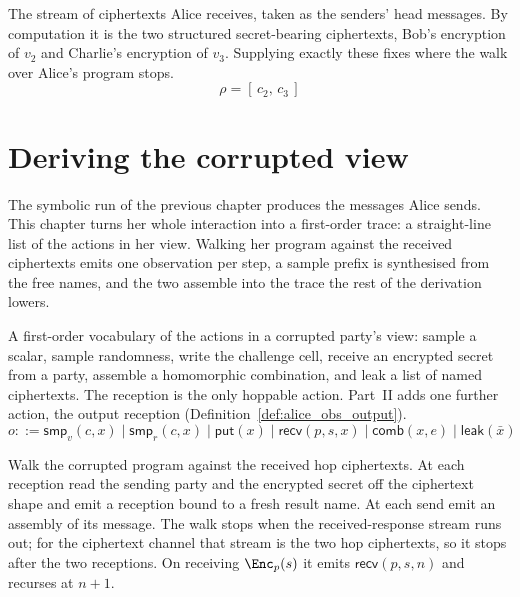 \begin{definition}
  \label{def:received_hops}
  \rocqok
  The stream of ciphertexts Alice receives, taken as the senders' head messages.
  By computation it is the two structured secret-bearing ciphertexts, Bob's
  encryption of $v_2$ and Charlie's encryption of $v_3$. Supplying exactly these
  fixes where the walk over Alice's program stops.
  \[ \rho = [\, c_2, \, c_3 \,] \]
\end{definition}

\chapter{Deriving the corrupted view}

The symbolic run of the previous chapter produces the messages Alice sends. This
chapter turns her whole interaction into a first-order trace: a straight-line
list of the actions in her view. Walking her program against the received
ciphertexts emits one observation per step, a sample prefix is synthesised from
the free names, and the two assemble into the trace the rest of the derivation
lowers.

\begin{definition}
  \label{def:alice_obs}
  \rocqok
  A first-order vocabulary of the actions in a corrupted party's view: sample a
  scalar, sample randomness, write the challenge cell, receive an encrypted
  secret from a party, assemble a homomorphic combination, and leak a list of
  named ciphertexts. The reception is the only hoppable action. Part~II adds one
  further action, the output reception
  (Definition~\ref{def:alice_obs_output}).
  \[ o ::= \mathsf{smp}_v(c,x) \mid \mathsf{smp}_r(c,x) \mid \mathsf{put}(x)
        \mid \mathsf{recv}(p,s,x) \mid \mathsf{comb}(x,e) \mid \mathsf{leak}(\bar x) \]
\end{definition}

\begin{definition}
  \label{def:walk_obs}
  \rocqok
  Walk the corrupted program against the received hop ciphertexts. At each
  reception read the sending party and the encrypted secret off the ciphertext
  shape and emit a reception bound to a fresh result name. At each send emit an
  assembly of its message. The walk stops when the received-response stream runs
  out; for the ciphertext channel that stream is the two hop ciphertexts, so it
  stops after the two receptions. On receiving $\Enc_p(s)$ it emits
  $\mathsf{recv}(p,s,n)$ and recurses at $n{+}1$.
\end{definition}

